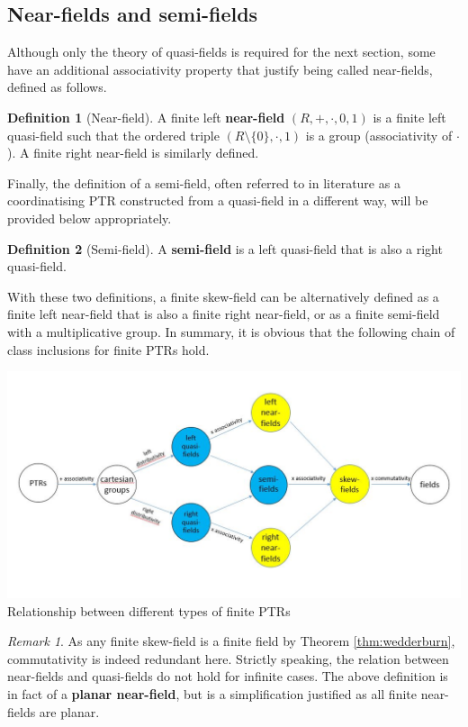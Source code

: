 \documentclass{report}
\theoremstyle{definition}\newtheorem*{definition}{Definition}
\theoremstyle{definition}\newtheorem*{example}{Example}
\theoremstyle{remark}\newtheorem*{remark}{Remark}
\begin{document}
\subsection{Near-fields and semi-fields}

Although only the theory of quasi-fields is required for the next section, some have an additional associativity property that justify being called near-fields, defined as follows.

\begin{definition}[Near-field]
A finite left \textbf{near-field} $ (R, +, \cdot, 0, 1) $ is a finite left quasi-field such that the ordered triple $ (R \setminus \{ 0 \}, \cdot, 1) $ is a group (associativity of $ \cdot $). A finite right near-field is similarly defined.
\end{definition}

Finally, the definition of a semi-field, often referred to in literature as a coordinatising PTR constructed from a quasi-field in a different way, will be provided below appropriately.

\begin{definition}[Semi-field]
A \textbf{semi-field} is a left quasi-field that is also a right quasi-field.
\end{definition}

With these two definitions, a finite skew-field can be alternatively defined as a finite left near-field that is also a finite right near-field, or as a finite semi-field with a multiplicative group. In summary, it is obvious that the following chain of class inclusions for finite PTRs hold.

\begin{center}
\includegraphics[width=\textwidth]{figures/commutative.jpg}
Relationship between different types of finite PTRs
\end{center}

\begin{remark}
As any finite skew-field is a finite field by Theorem \ref{thm:wedderburn}, commutativity is indeed redundant here. Strictly speaking, the relation between near-fields and quasi-fields do not hold for infinite cases. The above definition is in fact of a \textbf{planar near-field}, but is a simplification justified as all finite near-fields are planar.
\end{remark}
\end{document}
